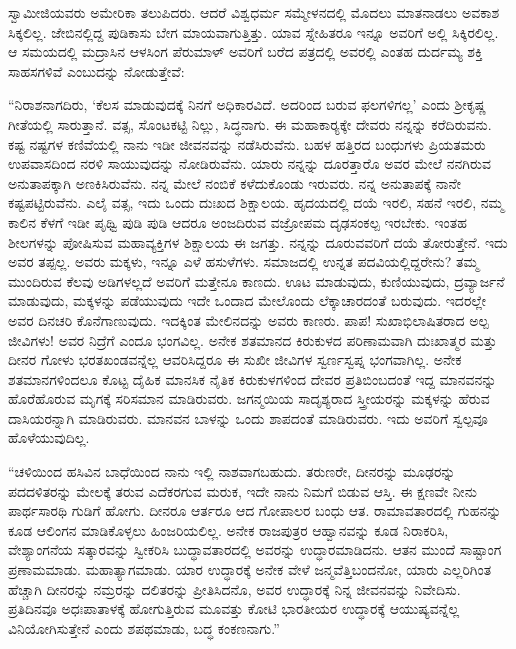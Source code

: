  ಸ್ವಾಮೀಜಿಯವರು ಅಮೇರಿಕಾ ತಲುಪಿದರು. ಆದರೆ ವಿಶ್ವಧರ್ಮ ಸಮ್ಮೇಳನದಲ್ಲಿ ಮೊದಲು ಮಾತನಾಡಲು ಅವಕಾಶ ಸಿಕ್ಕಲಿಲ್ಲ. ಜೇಬಿನಲ್ಲಿದ್ದ ಪುಡಿಕಾಸು ಬೇಗ ಮಾಯವಾಗುತ್ತಿತ್ತು. ಯಾವ ಸ್ನೇಹಿತರೂ ಇನ್ನೂ ಅವರಿಗೆ ಅಲ್ಲಿ ಸಿಕ್ಕಿರಲಿಲ್ಲ. ಆ ಸಮಯದಲ್ಲಿ ಮದ್ರಾಸಿನ ಆಳಸಿಂಗ ಪೆರುಮಾಳ್ ಅವರಿಗೆ ಬರೆದ ಪತ್ರದಲ್ಲಿ ಅವರಲ್ಲಿ ಎಂತಹ ದುರ್ದಮ್ಯ ಶಕ್ತಿ ಸಾಹಸಗಳಿವೆ ಎಂಬುದನ್ನು ನೋಡುತ್ತೇವೆ: 

 “ನಿರಾಶನಾಗದಿರು, ‘ಕೆಲಸ ಮಾಡುವುದಕ್ಕೆ ನಿನಗೆ ಅಧಿಕಾರವಿದೆ. ಅದರಿಂದ ಬರುವ ಫಲಗಳಿಗಲ್ಲ’ ಎಂದು ಶ‍್ರೀಕೃಷ್ಣ ಗೀತೆಯಲ್ಲಿ ಸಾರುತ್ತಾನೆ. ವತ್ಸ, ಸೊಂಟಕಟ್ಟಿ ನಿಲ್ಲು, ಸಿದ್ಧನಾಗು. ಈ ಮಹಾಕಾರ‍್ಯಕ್ಕೇ ದೇವರು ನನ್ನನ್ನು ಕರೆದಿರುವನು. ಕಷ್ಟ ನಷ್ಟಗಳ ಕಣಿವೆಯಲ್ಲಿ ನಾನು ಇಡೀ ಜೀವನವನ್ನು ನಡೆಸಿರುವೆನು. ಬಹಳ ಹತ್ತಿರದ ಬಂಧುಗಳು ಪ್ರಿಯತಮರು ಉಪವಾಸದಿಂದ ನರಳಿ ಸಾಯುವುದನ್ನು ನೋಡಿರುವೆನು. ಯಾರು ನನ್ನನ್ನು ದೂರತ್ತಾರೊ ಅವರ ಮೇಲೆ ನನಗಿರುವ ಅನುತಾಪಕ್ಕಾಗಿ ಅಣಕಿಸಿರುವೆನು. ನನ್ನ ಮೇಲೆ ನಂಬಿಕೆ ಕಳೆದುಕೊಂಡು ಇರುವರು. ನನ್ನ ಅನುತಾಪಕ್ಕೆ ನಾನೇ ಕಷ್ಟಪಟ್ಟಿರುವೆನು. ಎಲೈ ವತ್ಸ, ಇದು ಒಂದು ದುಃಖದ ಶಿಕ್ಷಾಲಯ. ಹೃದಯದಲ್ಲಿ ದಯೆ ಇರಲಿ, ಸಹನೆ ಇರಲಿ, ನಮ್ಮ ಕಾಲಿನ ಕೆಳಗೆ ಇಡೀ ಪೃಥ್ವಿ ಪುಡಿ ಪುಡಿ ಆದರೂ ಅಂಜದಿರುವ ವಜ್ರೋಪಮ ದೃಢಸಂಕಲ್ಪ ಇರಬೇಕು. ಇಂತಹ ಶೀಲಗಳನ್ನು ಪೋಷಿಸುವ ಮಹಾವ್ಯಕ್ತಿಗಳ ಶಿಕ್ಷಾಲಯ ಈ ಜಗತ್ತು. ನನ್ನನ್ನು ದೂರುವವರಿಗೆ ದಯೆ ತೋರುತ್ತೇನೆ. ಇದು ಅವರ ತಪ್ಪಲ್ಲ. ಅವರು ಮಕ್ಕಳು, ಇನ್ನೂ ಎಳೆ ಹಸುಳೆಗಳು. ಸಮಾಜದಲ್ಲಿ ಉನ್ನತ ಪದವಿಯಲ್ಲಿದ್ದರೇನು? ತಮ್ಮ ಮುಂದಿರುವ ಕೆಲವು ಅಡಿಗಳಲ್ಲದೆ ಅವರಿಗೆ ಮತ್ತೇನೂ ಕಾಣದು. ಊಟ ಮಾಡುವುದು, ಕುಣಿಯುವುದು, ದ್ರವ್ಯಾರ್ಜನೆ ಮಾಡುವುದು, ಮಕ್ಕಳನ್ನು ಪಡೆಯುವುದು ಇದೇ ಒಂದಾದ ಮೇಲೊಂದು ಲೆಕ್ಕಾಚಾರದಂತೆ ಬರುವುದು. ಇದರಲ್ಲೇ ಅವರ ದಿನಚರಿ ಕೊನೆಗಾಣುವುದು. ಇದಕ್ಕಿಂತ ಮೇಲಿನದನ್ನು ಅವರು ಕಾಣರು. ಪಾಪ! ಸುಖಾಭಿಲಾಷಿತರಾದ ಅಲ್ಪ ಜೀವಿಗಳು! ಅವರ ನಿದ್ರೆಗೆ ಎಂದೂ ಭಂಗವಿಲ್ಲ. ಅನೇಕ ಶತಮಾನದ ಕಿರುಕುಳದ ಪರಿಣಾಮವಾಗಿ ದುಃಖಾತ್ಮರ ಮತ್ತು ದೀನರ ಗೋಳು ಭರತಖಂಡವನ್ನೆಲ್ಲ ಆವರಿಸಿದ್ದರೂ ಈ ಸುಖೀ ಜೀವಿಗಳ ಸ್ವರ್ಣಸ್ವಪ್ನ ಭಂಗವಾಗಿಲ್ಲ. ಅನೇಕ ಶತಮಾನಗಳಿಂದಲೂ ಕೊಟ್ಟ ದೈಹಿಕ ಮಾನಸಿಕ ನೈತಿಕ ಕಿರುಕುಳಗಳಿಂದ ದೇವರ ಪ್ರತಿಬಿಂಬದಂತೆ ಇದ್ದ ಮಾನವನನ್ನು ಹೊರೆಹೊರುವ ಮೃಗಕ್ಕೆ ಸರಿಸಮಾನ ಮಾಡಿರುವರು. ಜಗನ್ಮಯಿಯ ಸಾದೃಶ್ಯರಾದ ಸ್ತ್ರೀಯರನ್ನು ಮಕ್ಕಳನ್ನು ಹೆರುವ ದಾಸಿಯರನ್ನಾಗಿ ಮಾಡಿರುವರು. ಮಾನವನ ಬಾಳನ್ನು ಒಂದು ಶಾಪದಂತೆ ಮಾಡಿರುವರು. ಇದು ಅವರಿಗೆ ಸ್ವಲ್ಪವೂ ಹೊಳೆಯುವುದಿಲ್ಲ. 

 “ಚಳಿಯಿಂದ ಹಸಿವಿನ ಬಾಧೆಯಿಂದ ನಾನು ಇಲ್ಲಿ ನಾಶವಾಗಬಹುದು. ತರುಣರೇ, ದೀನರನ್ನು ಮೂಢರನ್ನು ಪದದಳಿತರನ್ನು ಮೇಲಕ್ಕೆ ತರುವ ಎದೆಕರಗುವ ಮರುಕ, ಇದೇ ನಾನು ನಿಮಗೆ ಬಿಡುವ ಆಸ್ತಿ. ಈ ಕ್ಷಣವೇ ನೀನು ಪಾರ್ಥಸಾರಥಿ ಗುಡಿಗೆ ಹೋಗು. ದೀನರೂ ಆರ್ತರೂ ಆದ ಗೋಪಾಲರ ಬಂಧು ಆತ. ರಾಮಾವತಾರದಲ್ಲಿ ಗುಹನನ್ನು ಕೂಡ ಆಲಿಂಗನ ಮಾಡಿಕೊಳ್ಳಲು ಹಿಂಜರಿಯಲಿಲ್ಲ. ಅನೇಕ ರಾಜಪುತ್ರರ ಆಹ್ವಾನವನ್ನು ಕೂಡ ನಿರಾಕರಿಸಿ, ವೇಶ್ಯಾಂಗನೆಯ ಸತ್ಕಾರವನ್ನು ಸ್ವೀಕರಿಸಿ ಬುದ್ಧಾವತಾರದಲ್ಲಿ ಅವರನ್ನು ಉದ್ಧಾರಮಾಡಿದನು. ಆತನ ಮುಂದೆ ಸಾಷ್ಟಾಂಗ ಪ್ರಣಾಮಮಾಡು. ಮಹಾತ್ಯಾಗಮಾಡು. ಯಾರ ಉದ್ಧಾರಕ್ಕೆ ಅನೇಕ ವೇಳೆ ಜನ್ಮವೆತ್ತಿಬಂದನೋ, ಯಾರು ಎಲ್ಲರಿಗಿಂತ ಹೆಚ್ಚಾಗಿ ದೀನರನ್ನು ನಮ್ರರನ್ನು ದಲಿತರನ್ನು ಪ್ರೀತಿಸಿದನೊ, ಅವರ ಉದ್ಧಾರಕ್ಕೆ ನಿನ್ನ ಜೀವನವನ್ನು ನಿವೇದಿಸು. ಪ್ರತಿದಿನವೂ ಅಧಃಪಾತಾಳಕ್ಕೆ ಹೋಗುತ್ತಿರುವ ಮೂವತ್ತು ಕೋಟಿ ಭಾರತೀಯರ ಉದ್ಧಾರಕ್ಕೆ ಆಯುಷ್ಯವನ್ನೆಲ್ಲ ವಿನಿಯೋಗಿಸುತ್ತೇನೆ ಎಂದು ಶಪಥಮಾಡು, ಬದ್ಧ ಕಂಕಣನಾಗು.” 


